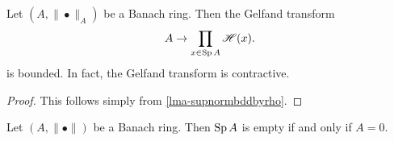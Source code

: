 \begin{proposition}\label{prop-Gelfbdd}
    Let $(A,\|\bullet\|_A)$ be a Banach ring. Then the Gelfand transform
    \[
        A\rightarrow \prod_{x\in \operatorname{Sp} A} \mathscr{H}(x).    
    \]
    is bounded. In fact, the Gelfand transform is contractive.
\end{proposition}
\begin{proof}
    This follows simply from \cref{lma-supnormbddbyrho}.
\end{proof}



\begin{proposition}\label{prop-Berkospecnonempty}
    Let $(A,\|\bullet\|)$ be a Banach ring. Then $\operatorname{Sp} A$ is empty if and only if $A=0$.
\end{proposition}

